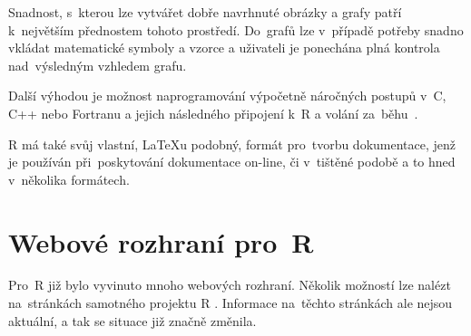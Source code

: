 \documentclass[thesis=B,czech]{FITthesis}[2012/06/26]
\begin{document}
Snadnost, s~kterou lze vytvářet dobře navrhnuté obrázky a grafy patří k~největším přednostem tohoto prostředí. Do~grafů lze v~případě potřeby snadno vkládat matematické symboly a vzorce a uživateli je ponechána plná kontrola nad~výsledným vzhledem grafu. 

Další výhodou je možnost naprogramování výpočetně náročných postupů v~C, C++ nebo Fortranu a jejich následného připojení k~R a volání za~běhu~\cite{rproject.org-about}. 

R má také svůj vlastní, LaTeXu podobný, formát pro~tvorbu dokumentace, jenž je používán při~poskytování dokumentace on-line, či v~tištěné podobě a to hned v~několika formátech.

\section{Webové rozhraní pro~R}

Pro~R již bylo vyvinuto mnoho webových rozhraní. Několik možností lze nalézt na~stránkách samotného projektu R \cite{rproject.org-webInterfaces}. Informace na~těchto stránkách ale nejsou aktuální, a tak se situace již značně změnila. 
\end{document}
